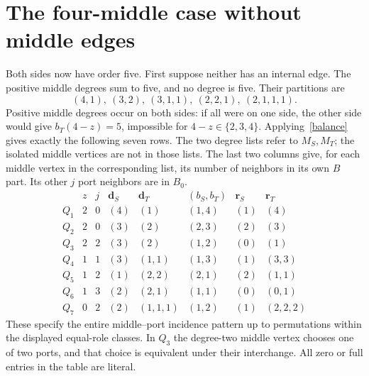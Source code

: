 \documentclass[11pt]{article}
\begin{document}
\section{The four-middle case without middle edges}

Both sides now have order five. First suppose neither has an internal
edge. The positive middle degrees sum to five, and no degree is five.
Their partitions are
\[
 (4,1),\ (3,2),\ (3,1,1),\ (2,2,1),\ (2,1,1,1).
\]
Positive middle degrees occur on both sides: if all were on one side,
the other side would give $b_T(4-z)=5$, impossible for
$4-z\in\{2,3,4\}$. Applying~\eqref{balance} gives exactly the following
seven rows. The two degree lists refer to $M_S,M_T$; the isolated
middle vertices are not in those lists. The last two columns give, for
each middle vertex in the corresponding list, its number of neighbors
in its own $B$ part. Its other $j$ port neighbors are in $B_0$.
\[
\begin{array}{c|c|c|c|c|c|c|c}
 &z&j&\mathbf d_S&\mathbf d_T&(b_S,b_T)&\mathbf r_S&\mathbf r_T\\\hline
 Q_1&2&0&(4)&(1)&(1,4)&(1)&(4)\\
 Q_2&2&0&(3)&(2)&(2,3)&(2)&(3)\\
 Q_3&2&2&(3)&(2)&(1,2)&(0)&(1)\\
 Q_4&1&1&(3)&(1,1)&(1,3)&(1)&(3,3)\\
 Q_5&1&2&(1)&(2,2)&(2,1)&(2)&(1,1)\\
 Q_6&1&3&(2)&(2,1)&(1,1)&(0)&(0,1)\\
 Q_7&0&2&(2)&(1,1,1)&(1,2)&(1)&(2,2,2)
\end{array}
\]
These specify the entire middle--port incidence pattern up to permutations
within the displayed equal-role classes. In $Q_3$ the degree-two middle
vertex chooses one of two ports, and that choice is equivalent under
their interchange. All zero or full entries in the table are literal.
\end{document}
